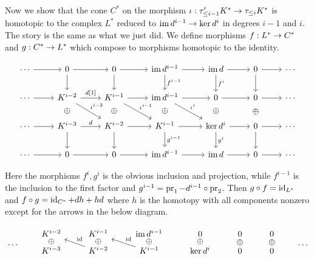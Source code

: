 \documentclass[deligne.tex]{subfiles}
\begin{document}
Now we show that the cone $C^*$ on the morphism
$\iota:\tau'_{\leq i-1}K^*\rightarrow\tau_{\leq i}K^*$ is homotopic to the complex
$L^*$ reduced to $\operatorname{im} d^{i-1}\rightarrow\ker d^i$ in degrees $i-1$ and $i$. 
The story is the same as what we just did. We define morphisms
$f:L^*\rightarrow C^*$ and $g:C^*\rightarrow L^*$ which compose to morphisms homotopic to
the identity.
\begin{ceqn}\begin{equation*}\begin{tikzcd}
	\cdots\arrow[r]
	&0\arrow[r]\arrow[d]
	&0\arrow[r]\arrow[d]
	&\im d^{i-1}\arrow[r]\arrow[d,"f^{i-1}"]
	&\im d\arrow[r]\arrow[d,"f^i"]
	&0\arrow[r]\arrow[d]
	&\cdots \\
	\cdots\arrow[r]
	&K^{i-2}\arrow[d,phantom,"\oplus"]\arrow[r,"{d[1]}"]\arrow[dr,"\iota^{i-2}"]
	&K^{i-1}\arrow[r]\arrow[d,phantom,"\oplus"]\arrow[dr,"\iota^{i-1}"]
	&\im d^{i-1}\arrow[r]\arrow[d,phantom,"\oplus"]\arrow[dr,"\iota^i"]
	&0\arrow[r]\arrow[d,phantom,"\oplus"]
	&0\arrow[r]\arrow[d,phantom,"\oplus"]
	&\cdots \\
	\cdots\arrow[r]
	&K^{i-3}\arrow[r,"d"]\arrow[d]
	&K^{i-2}\arrow[r]\arrow[d]
	&K^{i-1}\arrow[r]\arrow[d,"g^{i-1}"]
	&\ker d^i\arrow[r]\arrow[d,"g^i"]
	&0\arrow[r]\arrow[d]
	&\cdots \\
	\cdots\arrow[r]
 	&0\arrow[r]
	&0\arrow[r]
	&\im d^{i-1}\arrow[r]
	&\im d\arrow[r]
	&0\arrow[r]
	&\cdots
\end{tikzcd}\end{equation*}\end{ceqn}
Here the morphisms $f^i,g^i$ is the obvious inclusion and projection, while
$f^{i-1}$ is the inclusion to the first factor and
$g^{i-1}=\operatorname{pr}_1-d^{i-1}\circ\operatorname{pr}_2$. Then $g\circ f=\operatorname{id}_{L^*}$ and
$f\circ g=\operatorname{id}_{C^*}+dh+hd$ where $h$ is the homotopy with all components
nonzero except for the arrows in the below diagram.
\begin{ceqn}\begin{equation*}\begin{tikzcd}[row sep=tiny]
	\;\arrow[d,phantom,"\cdots"]
	&K^{i-2}\arrow[d,phantom,"\oplus"]
	&K^{i-1}\arrow[d,phantom,"\oplus"]
	&\im d^{i-1}\arrow[d,phantom,"\oplus"]
	&0\arrow[d,phantom,"\oplus"]
	&0\arrow[d,phantom,"\oplus"]
	&0\arrow[d,phantom,"\oplus"]
	&\;\arrow[d,phantom,"\cdots"] \\
	\;
	&K^{i-3}
	&K^{i-2}\arrow[ul,"\id"']
	&K^{i-1} \arrow[ul,"\id"']
	&\ker d^i
	&0
	&0
	&\;
\end{tikzcd}\end{equation*}\end{ceqn}
\end{document}
